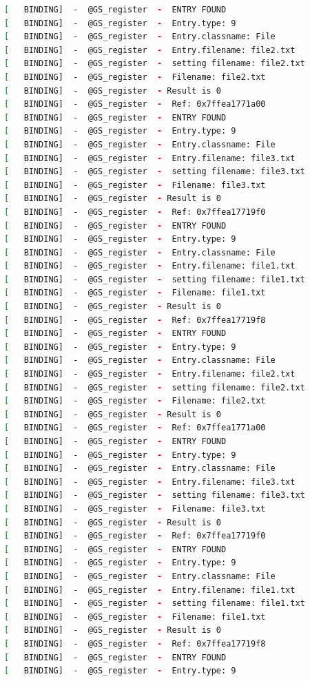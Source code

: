\begin{lstlisting}[language=bash]
[   BINDING]  -  @GS_register  -  ENTRY FOUND
[   BINDING]  -  @GS_register  -  Entry.type: 9
[   BINDING]  -  @GS_register  -  Entry.classname: File
[   BINDING]  -  @GS_register  -  Entry.filename: file2.txt
[   BINDING]  -  @GS_register  -  setting filename: file2.txt
[   BINDING]  -  @GS_register  -  Filename: file2.txt
[   BINDING]  -  @GS_register  - Result is 0
[   BINDING]  -  @GS_register  -  Ref: 0x7ffea1771a00
[   BINDING]  -  @GS_register  -  ENTRY FOUND
[   BINDING]  -  @GS_register  -  Entry.type: 9
[   BINDING]  -  @GS_register  -  Entry.classname: File
[   BINDING]  -  @GS_register  -  Entry.filename: file3.txt
[   BINDING]  -  @GS_register  -  setting filename: file3.txt
[   BINDING]  -  @GS_register  -  Filename: file3.txt
[   BINDING]  -  @GS_register  - Result is 0
[   BINDING]  -  @GS_register  -  Ref: 0x7ffea17719f0
[   BINDING]  -  @GS_register  -  ENTRY FOUND
[   BINDING]  -  @GS_register  -  Entry.type: 9
[   BINDING]  -  @GS_register  -  Entry.classname: File
[   BINDING]  -  @GS_register  -  Entry.filename: file1.txt
[   BINDING]  -  @GS_register  -  setting filename: file1.txt
[   BINDING]  -  @GS_register  -  Filename: file1.txt
[   BINDING]  -  @GS_register  - Result is 0
[   BINDING]  -  @GS_register  -  Ref: 0x7ffea17719f8
[   BINDING]  -  @GS_register  -  ENTRY FOUND
[   BINDING]  -  @GS_register  -  Entry.type: 9
[   BINDING]  -  @GS_register  -  Entry.classname: File
[   BINDING]  -  @GS_register  -  Entry.filename: file2.txt
[   BINDING]  -  @GS_register  -  setting filename: file2.txt
[   BINDING]  -  @GS_register  -  Filename: file2.txt
[   BINDING]  -  @GS_register  - Result is 0
[   BINDING]  -  @GS_register  -  Ref: 0x7ffea1771a00
[   BINDING]  -  @GS_register  -  ENTRY FOUND
[   BINDING]  -  @GS_register  -  Entry.type: 9
[   BINDING]  -  @GS_register  -  Entry.classname: File
[   BINDING]  -  @GS_register  -  Entry.filename: file3.txt
[   BINDING]  -  @GS_register  -  setting filename: file3.txt
[   BINDING]  -  @GS_register  -  Filename: file3.txt
[   BINDING]  -  @GS_register  - Result is 0
[   BINDING]  -  @GS_register  -  Ref: 0x7ffea17719f0
[   BINDING]  -  @GS_register  -  ENTRY FOUND
[   BINDING]  -  @GS_register  -  Entry.type: 9
[   BINDING]  -  @GS_register  -  Entry.classname: File
[   BINDING]  -  @GS_register  -  Entry.filename: file1.txt
[   BINDING]  -  @GS_register  -  setting filename: file1.txt
[   BINDING]  -  @GS_register  -  Filename: file1.txt
[   BINDING]  -  @GS_register  - Result is 0
[   BINDING]  -  @GS_register  -  Ref: 0x7ffea17719f8
[   BINDING]  -  @GS_register  -  ENTRY FOUND
[   BINDING]  -  @GS_register  -  Entry.type: 9

\end{lstlisting}
